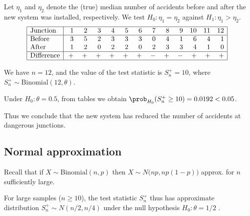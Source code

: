 \begin{solution}
Let $\eta_1$ and $\eta_2$ denote the (true) median number of accidents before and after the new system was installed, respectively. We test $H_0:\eta_1=\eta_2$ against $H_1:\eta_1 > \eta_2$.
\[\begin{array}{|l|rrrrrrrrrrrr|} \hline
\text{Junction}	& \phantom{1}1 & \phantom{1}2 & \phantom{1}3 & \phantom{1}4 & \phantom{1}5 & \phantom{1}6 & \phantom{1}7 & \phantom{1}8 & \phantom{1}9 & 10 & 11 & 12 \\ \hline
\text{Before}		& 3 & 5 & 2 & 3 & 3 & 3 & 0 & 4 & 1 &  6 &  4 &  1 \\
\text{After}			& 1 & 2 & 0 & 2 & 2 & 0 & 2 & 3 & 3 &  4 &  1 &  0 \\ \hline
\text{Difference}	& + & + & + & + & + & + & - & + & - &  + &  + &  + \\ \hline
\end{array}\]

We have $n=12$, and the value of the test statistic is $S^{+}_n = 10$, where $S^{+}_n\sim\text{Binomial}(12,\theta)$.
\par
Under $H_0:\theta=0.5$, from tables we obtain $\prob_{H_0}(S^{+}_n\geq 10) = 0.0192 < 0.05$.
\par
Thus we conclude that the new system has reduced the number of accidents at dangerous junctions.
\end{solution}

\subsection{Normal approximation}
Recall that if $X\sim\text{Binomial}(n,p)$ then $X\sim N\big(np,np(1-p)\big)$ approx. for $n$ sufficiently large.

For large samples ($n\geq 10$), the test statistic $S^{+}_n$ thus has approximate distribution $S^{+}_n\sim N(n/2,n/4)$ under the null hypothesis $H_0:\theta=1/2$ .

